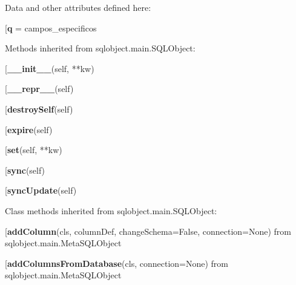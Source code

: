 Data and other attributes defined here:\\
\begin{description}\item[{\bf q} = campos\_especificos\end{description}


Methods inherited from sqlobject.main.SQLObject:\\
\begin{description}\item[{\bf \_\_init\_\_}(self, **kw)\end{description}

\begin{description}\item[{\bf \_\_repr\_\_}(self)\end{description}

\begin{description}\item[{\bf destroySelf}(self)\end{description}

\begin{description}\item[{\bf expire}(self)\end{description}

\begin{description}\item[{\bf set}(self, **kw)\end{description}

\begin{description}\item[{\bf sync}(self)\end{description}

\begin{description}\item[{\bf syncUpdate}(self)\end{description}


Class methods inherited from sqlobject.main.SQLObject:\\
\begin{description}\item[{\bf addColumn}(cls, columnDef, changeSchema=False, connection=None) from sqlobject.main.MetaSQLObject\end{description}

\begin{description}\item[{\bf addColumnsFromDatabase}(cls, connection=None) from sqlobject.main.MetaSQLObject\end{description}

